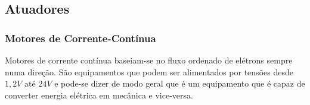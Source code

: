 \documentclass[portugues, brazil, a4paper,12pt]{article}
\makeatletter
\renewcommand{\paragraph}{\@startsection{paragraph}{4}{0ex}%
   {-3.25ex plus -1ex minus -0.2ex}%
   {1.5ex plus 0.2ex}%
   {\normalfont\normalsize\bfseries}}
\makeatother
\begin{document}

	\subsection{Atuadores}

		\subsubsection{Motores de Corrente-Contínua}
			Motores de corrente contínua baseiam-se no fluxo ordenado de elétrons sempre numa direção. São equipamentos que podem ser alimentados por tensões desde $1,2V$ até $24V$ e pode-se dizer de modo geral que é um equipamento que é capaz de converter energia elétrica em mecânica e vice-versa. 
\end{document}
